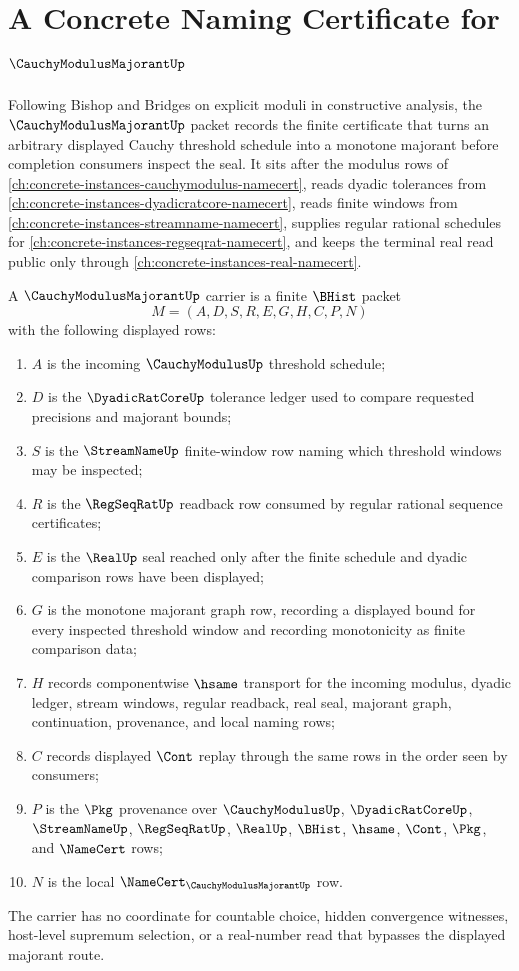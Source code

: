 \chapter{A Concrete Naming Certificate for $\CauchyModulusMajorantUp$}
\label{ch:concrete-instances-cauchy-modulus-majorant-namecert}

Following Bishop and Bridges on explicit moduli in constructive analysis, the $\CauchyModulusMajorantUp$ packet records the finite certificate that turns an arbitrary displayed Cauchy threshold schedule into a monotone majorant before completion consumers inspect the seal. It sits after the modulus rows of \autoref{ch:concrete-instances-cauchymodulus-namecert}, reads dyadic tolerances from \autoref{ch:concrete-instances-dyadicratcore-namecert}, reads finite windows from \autoref{ch:concrete-instances-streamname-namecert}, supplies regular rational schedules for \autoref{ch:concrete-instances-regseqrat-namecert}, and keeps the terminal real read public only through \autoref{ch:concrete-instances-real-namecert}.

\begin{definition}
\label{def:cauchy-modulus-majorant-carrier}
A $\CauchyModulusMajorantUp$ carrier is a finite $\BHist$ packet
$$
M=(A,D,S,R,E,G,H,C,P,N)
$$
with the following displayed rows:
\begin{enumerate}
\item $A$ is the incoming $\CauchyModulusUp$ threshold schedule;
\item $D$ is the $\DyadicRatCoreUp$ tolerance ledger used to compare requested precisions and majorant bounds;
\item $S$ is the $\StreamNameUp$ finite-window row naming which threshold windows may be inspected;
\item $R$ is the $\RegSeqRatUp$ readback row consumed by regular rational sequence certificates;
\item $E$ is the $\RealUp$ seal reached only after the finite schedule and dyadic comparison rows have been displayed;
\item $G$ is the monotone majorant graph row, recording a displayed bound for every inspected threshold window and recording monotonicity as finite comparison data;
\item $H$ records componentwise $\hsame$ transport for the incoming modulus, dyadic ledger, stream windows, regular readback, real seal, majorant graph, continuation, provenance, and local naming rows;
\item $C$ records displayed $\Cont$ replay through the same rows in the order seen by consumers;
\item $P$ is the $\Pkg$ provenance over $\CauchyModulusUp$, $\DyadicRatCoreUp$, $\StreamNameUp$, $\RegSeqRatUp$, $\RealUp$, $\BHist$, $\hsame$, $\Cont$, $\Pkg$, and $\NameCert$ rows;
\item $N$ is the local $\NameCert_{\CauchyModulusMajorantUp}$ row.
\end{enumerate}
The carrier has no coordinate for countable choice, hidden convergence witnesses, host-level supremum selection, or a real-number read that bypasses the displayed majorant route.
\end{definition}

